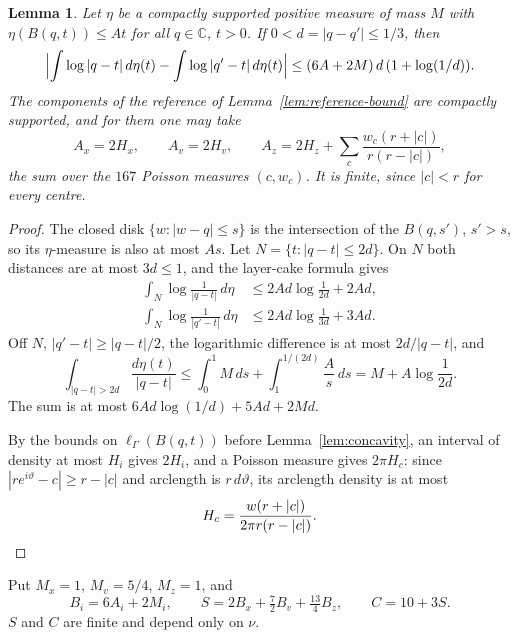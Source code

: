 \documentclass{amsart}
\newtheorem{lemma}{Lemma}[section]
\numberwithin{equation}{section}
\numberwithin{table}{section}
\begin{document}
\begin{lemma}\label{lem:potential-modulus}
Let $\eta$ be a compactly supported positive measure of mass $M$ with
$\eta(B(q,t))\le At$ for all $q\in\mathbb C$, $t>0$. If $0<d=|q-q'|\le1/3$, then
\[
 \Bigl|\int\log|q-t|\,d\eta(t)-\int\log|q'-t|\,d\eta(t)\Bigr|
 \le(6A+2M)\,d\,(1+\log(1/d)).
\]
The components of the reference of Lemma~\ref{lem:reference-bound} are
compactly supported, and for them one may take
\begin{equation}\label{eq:disk-constants}
 A_x=2H_x,\qquad A_v=2H_v,\qquad
 A_z=2H_z+\sum_c\frac{w_c(r+|c|)}{r(r-|c|)},
\end{equation}
the sum over the $167$ Poisson measures $(c,w_c)$. It is finite, since
$|c|<r$ for every centre.
\end{lemma}
\begin{proof}
The closed disk $\{w:|w-q|\le s\}$ is the intersection of the $B(q,s')$,
$s'>s$, so its $\eta$-measure is also at most $As$.
Let $N=\{t:|q-t|\le2d\}$. On $N$ both distances are at most $3d\le1$, and
the layer-cake formula gives
\begin{align*}
 \int_N\log\frac1{|q-t|}\,d\eta&\le2Ad\log\frac1{2d}+2Ad,\\
 \int_N\log\frac1{|q'-t|}\,d\eta&\le2Ad\log\frac1{3d}+3Ad.
\end{align*}
Off $N$, $|q'-t|\ge|q-t|/2$, the logarithmic difference is at most
$2d/|q-t|$, and
\[
 \int_{|q-t|>2d}\frac{d\eta(t)}{|q-t|}
 \le\int_0^1M\,ds+\int_1^{1/(2d)}\frac As\,ds
 =M+A\log\frac1{2d}.
\]
The sum is at most $6Ad\log(1/d)+5Ad+2Md$.

By the bounds on $\ell_\Gamma(B(q,t))$ before Lemma~\ref{lem:concavity}, an
interval of density at most $H_i$ gives $2H_i$, and a Poisson measure gives
$2\pi H_c$: since $|re^{i\vartheta}-c|\ge r-|c|$ and arclength is
$r\,d\vartheta$, its arclength density is at most
\begin{equation}\label{eq:poisson-density}
 H_c=\frac{w(r+|c|)}{2\pi r(r-|c|)}.\qedhere
\end{equation}
\end{proof}

Put $M_x=1$, $M_v=5/4$, $M_z=1$, and
\begin{equation}\label{eq:S-constant}
 B_i=6A_i+2M_i,\qquad
 S=2B_x+\tfrac72B_v+\tfrac{13}4B_z,\qquad C=10+3S.
\end{equation}
$S$ and $C$ are finite and depend only on $\nu$.
\end{document}
